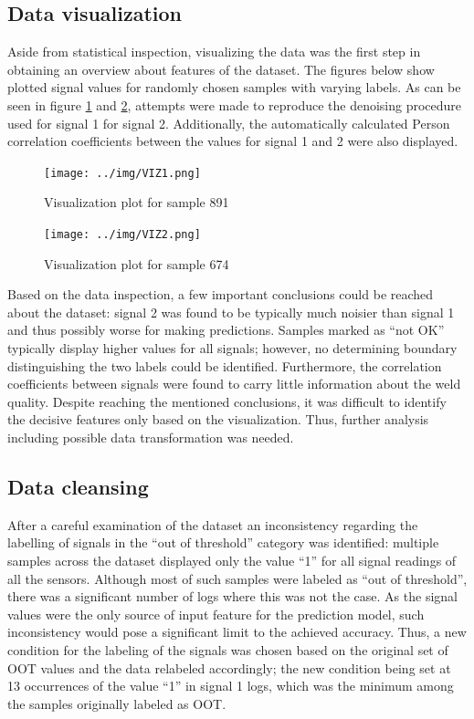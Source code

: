 \documentclass[12pt]{report}
\begin{document}
\subsection{Data visualization}
Aside from statistical inspection, visualizing the data was the first step in obtaining an overview about features of the dataset. The figures below show plotted signal values for randomly chosen samples with varying labels. As can be seen in figure \ref{fig:VIZ1} and \ref{fig:VIZ2}, attempts were made to reproduce the denoising procedure used for signal 1 for signal 2. Additionally, the automatically calculated Person correlation coefficients between the values for signal 1 and 2 were also displayed.

\begin{figure}[H]
	\texttt{[image: ../img/VIZ1.png]}
	\caption{Visualization plot for sample 891}
	\label{fig:VIZ1}
\end{figure}
\begin{figure}[H]
	\texttt{[image: ../img/VIZ2.png]}
	\caption{Visualization plot for sample 674}
	\label{fig:VIZ2}
\end{figure}

Based on the data inspection, a few important conclusions could be reached about the dataset: signal 2 was found to be typically much noisier than signal 1 and thus possibly worse for making predictions. Samples marked as “not OK” typically display higher values for all signals; however, no determining boundary distinguishing the two labels could be identified. Furthermore, the correlation coefficients between signals were found to carry little information about the weld quality. Despite reaching the mentioned conclusions, it was difficult to identify the decisive features only based on the visualization. Thus, further analysis including possible data transformation was needed.
\subsection{Data cleansing}
After a careful examination of the dataset an inconsistency regarding the labelling of signals in the “out of threshold” category was identified: multiple samples across the dataset displayed only the value “1” for all signal readings of all the sensors. Although most of such samples were labeled as “out of threshold”, there was a significant number of logs where this was not the case. As the signal values were the only source of input feature for the prediction model, such inconsistency would pose a significant limit to the achieved accuracy. Thus, a new condition for the labeling of the signals was chosen based on the original set of OOT values and the data relabeled accordingly; the new condition being set at 13 occurrences of the value “1” in signal 1 logs, which was the minimum among the samples originally labeled as OOT.
\end{document}
